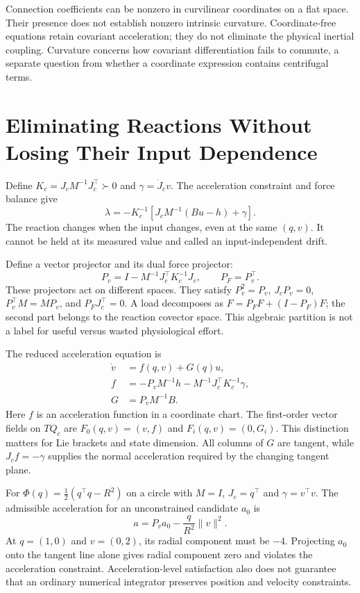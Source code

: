 Connection coefficients can be nonzero in curvilinear coordinates on a flat space. Their presence does not establish nonzero intrinsic curvature. Coordinate-free equations retain covariant acceleration; they do not eliminate the physical inertial coupling. Curvature concerns how covariant differentiation fails to commute, a separate question from whether a coordinate expression contains centrifugal terms.

\section{Eliminating Reactions Without Losing Their Input Dependence}
\label{sec:ch9:control-affine}

Define $K_c=J_cM^{-1}J_c^\top\succ0$ and $\gamma=\dot J_cv$. The acceleration constraint and force balance give
\begin{equation}
 \lambda=-K_c^{-1}\left[J_cM^{-1}(Bu-h)+\gamma\right].
 \label{eq:ch9:multiplier}
\end{equation}
The reaction changes when the input changes, even at the same $(q,v)$. It cannot be held at its measured value and called an input-independent drift.

Define a vector projector and its dual force projector:
\begin{equation}
 P_v=I-M^{-1}J_c^\top K_c^{-1}J_c,\qquad P_F=P_v^\top.
\end{equation}
These projectors act on different spaces. They satisfy $P_v^2=P_v$, $J_cP_v=0$, $P_v^\top M=MP_v$, and $P_FJ_c^\top=0$. A load decomposes as $F=P_FF+(I-P_F)F$; the second part belongs to the reaction covector space. This algebraic partition is not a label for useful versus wasted physiological effort.

The reduced acceleration equation is
\begin{align}
 \dot v&=f(q,v)+G(q)u,\\
 f&=-P_vM^{-1}h-M^{-1}J_c^\top K_c^{-1}\gamma,\label{eq:ch9:drift}\\
 G&=P_vM^{-1}B.\label{eq:ch9:input-field}
\end{align}
Here $f$ is an acceleration function in a coordinate chart. The first-order vector fields on $TQ_c$ are $F_0(q,v)=(v,f)$ and $F_i(q,v)=(0,G_i)$. This distinction matters for Lie brackets and state dimension. All columns of $G$ are tangent, while $J_cf=-\gamma$ supplies the normal acceleration required by the changing tangent plane.

For $\Phi(q)=\tfrac12(q^\top q-R^2)$ on a circle with $M=I$, $J_c=q^\top$ and $\gamma=v^\top v$. The admissible acceleration for an unconstrained candidate $a_0$ is
\begin{equation}
 a=P_va_0-\frac{q}{R^2}\|v\|^2.
\end{equation}
At $q=(1,0)$ and $v=(0,2)$, its radial component must be $-4$. Projecting $a_0$ onto the tangent line alone gives radial component zero and violates the acceleration constraint. Acceleration-level satisfaction also does not guarantee that an ordinary numerical integrator preserves position and velocity constraints.

